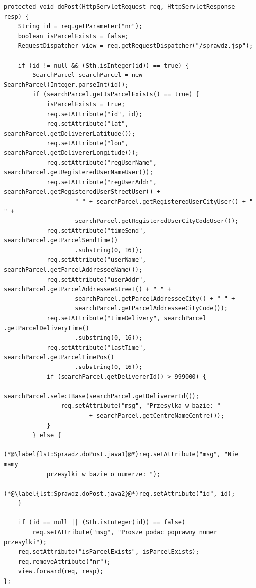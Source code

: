 \documentclass[eng,printmode,oneside]{mgr}
\begin{document}
\begin{lstlisting}[caption=Fragment klasy Sprawdz.java\,
metoda doPost(),label=lst:Sprawdz.doPost.java]
protected void doPost(HttpServletRequest req, HttpServletResponse resp) {
	String id = req.getParameter("nr");
	boolean isParcelExists = false;
	RequestDispatcher view = req.getRequestDispatcher("/sprawdz.jsp");
	
	if (id != null && (Sth.isInteger(id)) == true) {
		SearchParcel searchParcel = new SearchParcel(Integer.parseInt(id));
		if (searchParcel.getIsParcelExists() == true) {
			isParcelExists = true;
			req.setAttribute("id", id);
			req.setAttribute("lat", searchParcel.getDelivererLatitude());
			req.setAttribute("lon", searchParcel.getDelivererLongitude());
			req.setAttribute("regUserName",	searchParcel.getRegisteredUserNameUser());
			req.setAttribute("regUserAddr",	searchParcel.getRegisteredUserStreetUser() +
					" " + searchParcel.getRegisteredUserCityUser() + " " +
					searchParcel.getRegisteredUserCityCodeUser()); 
			req.setAttribute("timeSend", searchParcel.getParcelSendTime()
					.substring(0, 16));
			req.setAttribute("userName", searchParcel.getParcelAddresseeName());
			req.setAttribute("userAddr", searchParcel.getParcelAddresseeStreet() + " " +
					searchParcel.getParcelAddresseeCity() + " "	+ 
					searchParcel.getParcelAddresseeCityCode());
			req.setAttribute("timeDelivery", searchParcel .getParcelDeliveryTime()
					.substring(0, 16)); 
			req.setAttribute("lastTime", searchParcel.getParcelTimePos()
					.substring(0, 16));
			if (searchParcel.getDelivererId() > 999000) {
				searchParcel.selectBase(searchParcel.getDelivererId());
				req.setAttribute("msg", "Przesylka w bazie: "
						+ searchParcel.getCentreNameCentre());
			}
		} else {
			(*@\label{lst:Sprawdz.doPost.java1}@*)req.setAttribute("msg", "Nie mamy
			przesylki w bazie o numerze: ");
			(*@\label{lst:Sprawdz.doPost.java2}@*)req.setAttribute("id", id); 
	}
	
	if (id == null || (Sth.isInteger(id)) == false)
		req.setAttribute("msg", "Prosze podac poprawny numer przesylki"); 
	req.setAttribute("isParcelExists", isParcelExists);
	req.removeAttribute("nr");
	view.forward(req, resp);
};
\end{lstlisting}
\end{document}
